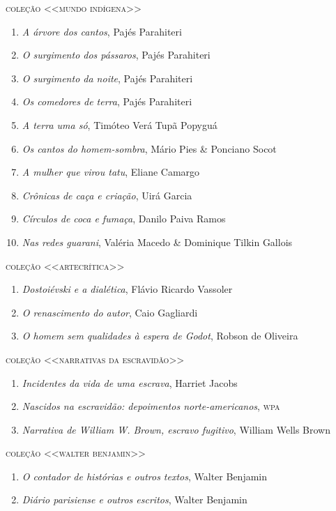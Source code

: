 \medskip
{\large\textsc{coleção <<mundo indígena>>}}

\begin{enumerate}
\setlength\parskip{4.2pt}
\setlength\itemsep{-1.4mm}
\item \textit{A árvore dos cantos}, Pajés Parahiteri
\item \textit{O surgimento dos pássaros}, Pajés Parahiteri
\item \textit{O surgimento da noite}, Pajés Parahiteri
\item \textit{Os comedores de terra}, Pajés Parahiteri
\item \textit{A terra uma só}, Timóteo Verá Tupã Popyguá
\item \textit{Os cantos do homem-sombra}, Mário Pies \& Ponciano Socot
\item \textit{A mulher que virou tatu}, Eliane Camargo
\item \textit{Crônicas de caça e criação}, Uirá Garcia
\item \textit{Círculos de coca e fumaça}, Danilo Paiva Ramos
\item \textit{Nas redes guarani}, Valéria Macedo \& Dominique Tilkin Gallois
\end{enumerate}

\medskip
{\large\textsc{coleção <<artecrítica>>}}

\begin{enumerate}
\setlength\parskip{4.2pt}
\setlength\itemsep{-1.4mm}
\item \textit{Dostoiévski e a dialética}, Flávio Ricardo Vassoler
\item \textit{O renascimento do autor}, Caio Gagliardi
\item \textit{O homem sem qualidades à espera de Godot}, Robson de Oliveira
\end{enumerate}

\medskip
{\large\textsc{coleção <<narrativas da escravidão>>}}

\begin{enumerate}
\setlength\parskip{4.2pt}
\setlength\itemsep{-1.4mm}
\item \textit{Incidentes da vida de uma escrava}, Harriet Jacobs
\item \textit{Nascidos na escravidão: depoimentos norte-americanos}, \textsc{wpa}
\item \textit{Narrativa de William W. Brown, escravo fugitivo}, William Wells Brown
\end{enumerate}

\medskip
{\large\textsc{coleção <<walter benjamin>>}}

\begin{enumerate}
\setlength\parskip{4.2pt}
\setlength\itemsep{-1.4mm}
\item \textit{O contador de histórias e outros textos}, Walter Benjamin
\item \textit{Diário parisiense e outros escritos}, Walter Benjamin
\end{enumerate}

\pagebreak